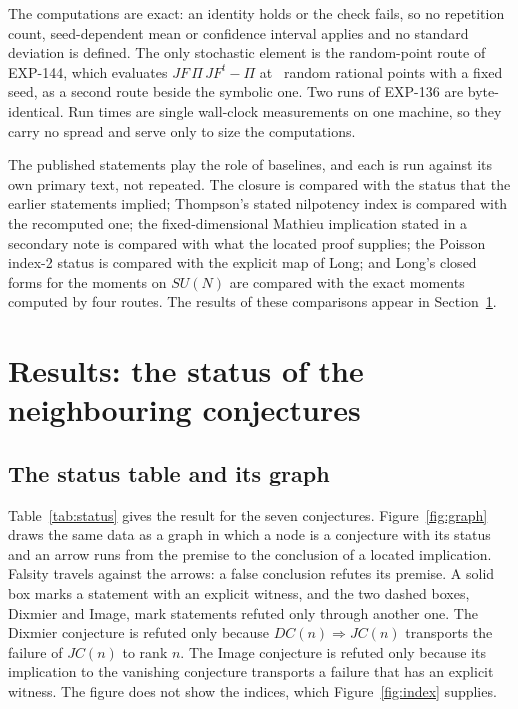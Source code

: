 \documentclass[11pt]{article}
\theoremstyle{remark}
\newcommand{\EXP}[1]{\mbox{EXP-#1}}
\begin{document}
The computations are exact: an identity holds or the check fails, so no repetition count, seed-dependent mean or confidence interval applies and no standard deviation is defined. The only stochastic element is the random-point route of \EXP{144}, which evaluates $JF\,\Pi\,JF^t-\Pi$ at \npoissonpts\ random rational points with a fixed seed, as a second route beside the symbolic one. Two runs of \EXP{136} are byte-identical. Run times are single wall-clock measurements on one machine, so they carry no spread and serve only to size the computations.

The published statements play the role of baselines, and each is run against its own primary text, not repeated. The closure is compared with the status that the earlier statements implied; Thompson's stated nilpotency index is compared with the recomputed one; the fixed-dimensional Mathieu implication stated in a secondary note is compared with what the located proof supplies; the Poisson index-2 status is compared with the explicit map of Long; and Long's closed forms for the moments on $SU(N)$ are compared with the exact moments computed by four routes. The results of these comparisons appear in Section~\ref{sec:results}.

\section{Results: the status of the neighbouring conjectures}\label{sec:results}

\subsection{The status table and its graph}\label{sec:table}

Table~\ref{tab:status} gives the result for the seven conjectures. Figure~\ref{fig:graph} draws the same data as a graph in which a node is a conjecture with its status and an arrow runs from the premise to the conclusion of a located implication. Falsity travels against the arrows: a false conclusion refutes its premise. A solid box marks a statement with an explicit witness, and the two dashed boxes, Dixmier and Image, mark statements refuted only through another one. The Dixmier conjecture is refuted only because $DC(n)\Rightarrow JC(n)$ transports the failure of $JC(n)$ to rank $n$. The Image conjecture is refuted only because its implication to the vanishing conjecture transports a failure that has an explicit witness. The figure does not show the indices, which Figure~\ref{fig:index} supplies.
\end{document}
